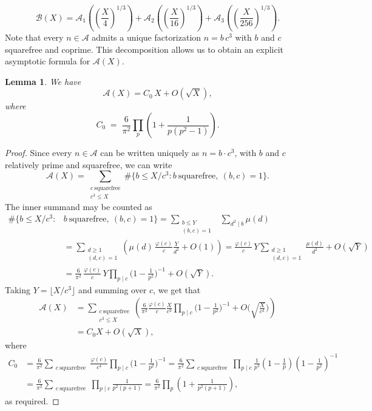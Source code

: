 \documentclass[11pt,reqno]{amsart}
\newcommand{\cA}{\mathcal{A}}
\newtheorem{lemma}[theorem]{Lemma}
\theoremstyle{definition}
\theoremstyle{remark}
\begin{document}
\begin{equation}\label{B(X)}
\mathcal{B}(X)
= \mathcal{A}_1\!\left( \left(\frac{X}{4}  \right)^{1/3}\right)
+ \mathcal{A}_2\!\left(\left(\frac{X}{16}  \right)^{1/3}\right)
+ \mathcal{A}_3\!\left(\left(\frac{X}{256}  \right)^{1/3}\right).
\end{equation}
Note that every $n\in\mathcal{A}$ admits a unique factorization $n=b\,c^{3}$ with $b$ and $c$ squarefree and coprime.  
This decomposition allows us to obtain an explicit asymptotic formula for $\mathcal{A}(X)$.  
\begin{lemma}\label{count:setA}
	We have
    \begin{equation*}
        \mathcal{A}(X)=C_0\,X+O(\sqrt{X}),
    \end{equation*}
    where
	\[
	C_0 \;=\; \frac{6}{\pi^2}\prod_{p}\left(1+\frac{1}{p(p^2-1)}\right).
	\]
\end{lemma}

\begin{proof}
	Since every $n\in\mathcal A$ can be written uniquely as $n = b\cdot c^3$,
	with $b$ and $c$ relatively prime and squarefree, we can write
	\[
	\cA(X)=\sum_{\substack{c \ \text{squarefree}\\ c^3\le X}}
	\#\{b \le X/c^3 : b \ \text{squarefree},\ (b,c)=1\}.
	\]	
    \noindent
	The inner summand may be counted as
	\begin{align*}
	    \#\{b \le X/c^3 :& b \ \text{squarefree},\ (b,c)=1\} = \sum_{\substack{b \le Y \\ (b,c)=1}} \;\;\sum_{d^2\mid b} \mu(d)\\
        &=\sum_{\substack{d\ge1\\(d,c)=1}} \left(\mu(d)\,\frac{\varphi(c)}{c}\frac{Y}{d^2} + O(1)\right)=\frac{\varphi(c)}{c}\,Y
	\sum_{\substack{d\ge1 \\ (d,c)=1}} \frac{\mu(d)}{d^2}
	+ O(\sqrt{Y})\\
        &  = \frac{6}{\pi^2}\,\frac{\varphi(c)}{c}\,Y
	\prod_{p\mid c}\Big(1-\frac{1}{p^2}\Big)^{-1} + O(\sqrt{Y}).
	\end{align*}
    Taking $Y=\lfloor X/c^3\rfloor$ and summing over $c$, we get that
    \begin{align*}
	\mathcal{A}(X)
	&= \sum_{\substack{c\ \mathrm{squarefree}\\ c^3\le X}}
	\left(
	\frac{6}{\pi^2}\frac{\varphi(c)}{c}\frac{X}{c^3}\prod_{p\mid c}\Big(1-\frac{1}{p^2}\Big)^{-1}
	+ O\!\Big(\sqrt{\frac{X}{c^3}}\Big)
	\right)\\
    & = C_0 X + O(\sqrt{X}),
	\end{align*}
    where
    \begin{align*}
        C_0&= \frac{6}{\pi^2}
	\sum_{\substack{c\ \mathrm{squarefree}}}
	\frac{\varphi(c)}{c^4}\prod_{p\mid c}\Big(1-\frac{1}{p^2}\Big)^{-1}=\frac{6}{\pi^2}\sum_{\substack{c\ \mathrm{squarefree}}} \prod_{p\mid c}\frac{1}{p^3} \left(1-\frac{1}{p}\right) \left(1-\frac{1}{p^2}\right)^{-1}\\
    &= \frac{6}{\pi^2}\sum_{\substack{c\ \mathrm{squarefree}}} \prod_{p\mid c} \frac{1}{p^2(p+1)} = \frac{6}{\pi^2}\prod_p \left(1+\frac{1}{p^2(p+1)}\right),
    \end{align*}
    as required.
\end{proof}
\end{document}
